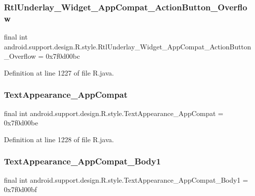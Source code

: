 \subsubsection{\texorpdfstring{RtlUnderlay\_Widget\_AppCompat\_ActionButton\_Overflow}{RtlUnderlay\_Widget\_AppCompat\_ActionButton\_Overflow}}
{\footnotesize\ttfamily final int android.\+support.\+design.\+R.\+style.\+Rtl\+Underlay\+\_\+\+Widget\+\_\+\+App\+Compat\+\_\+\+Action\+Button\+\_\+\+Overflow = 0x7f0d00bc\hspace{0.3cm}{\ttfamily [static]}}



Definition at line 1227 of file R.\+java.

\mbox{\label{classandroid_1_1support_1_1design_1_1_r_1_1style_a150f94913f3a6732ce3ba8a8afdd1e3a}} 
\subsubsection{\texorpdfstring{TextAppearance\_AppCompat}{TextAppearance\_AppCompat}}
{\footnotesize\ttfamily final int android.\+support.\+design.\+R.\+style.\+Text\+Appearance\+\_\+\+App\+Compat = 0x7f0d00be\hspace{0.3cm}{\ttfamily [static]}}



Definition at line 1228 of file R.\+java.

\mbox{\label{classandroid_1_1support_1_1design_1_1_r_1_1style_a8ed35c1c1c7ff1e4555efdd939993b32}} 
\subsubsection{\texorpdfstring{TextAppearance\_AppCompat\_Body1}{TextAppearance\_AppCompat\_Body1}}
{\footnotesize\ttfamily final int android.\+support.\+design.\+R.\+style.\+Text\+Appearance\+\_\+\+App\+Compat\+\_\+\+Body1 = 0x7f0d00bf\hspace{0.3cm}{\ttfamily [static]}}




